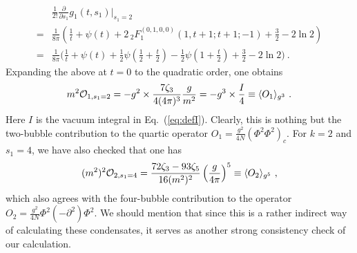 \documentclass[a4paper,11pt]{article}
\begin{document}
\begin{align}
&\frac{1}{2!}\frac{\partial}{\partial s_1}g_1(t,s_1)\bigg|_{s_1=2} \nonumber \\ 
=&\frac{1}{8\pi} \left(\frac{1}{t}+\psi(t)+2\,_2F_1^{(0,1,0,0)}(1,t+1;t+1;-1)+\frac{3}{2}-2\ln 2\right) \nonumber \\ 
=&\frac{1}{8\pi}\bigg(\frac{1}{t}+\psi(t)+\frac{1}{2} \psi \left(\frac{1}{2}+\frac{t}{2}\right)-\frac{1}{2} \psi \left(1+\frac{t}{2}\right)+\frac{3}{2}-2\ln 2\bigg)\ .
\end{align}
Expanding the above at $t=0$ to the quadratic order, one obtains 
\begin{align}
m^2{\cal O}_{1,s_1=2}=-g^2\times \frac{7\zeta_3}{4(4\pi)^3}\frac{g}{m^2}=-g^3\times\frac{I}{4}\equiv\langle O_1\rangle_{g^{3}} \ .
\end{align}
Here $I$ is the vacuum integral in Eq.~(\ref{eq:defI}). 
Clearly, this is nothing but the two-bubble contribution to the quartic operator $O_1=\frac{g^2}{4N}\left(\Phi^2\Phi^2\right)_c$.  For $k=2$ and $s_1=4$, we have also checked that one has
\begin{align}
(m^2)^2{\cal O}_{2,s_1=4}=\frac{72 \zeta_3-93 \zeta_5}{16(m^2)^2}\left(\frac{g}{4\pi }\right)^5\equiv \langle O_2\rangle_{g^5} \ , 
\end{align}
which also agrees with the four-bubble contribution to the operator $O_2=\frac{g^2}{4N}\Phi^2(-\partial^2)\Phi^2$. 
We should mention that since this is a rather indirect way of calculating these condensates, it serves as another strong consistency check of our calculation. 
\end{document}
